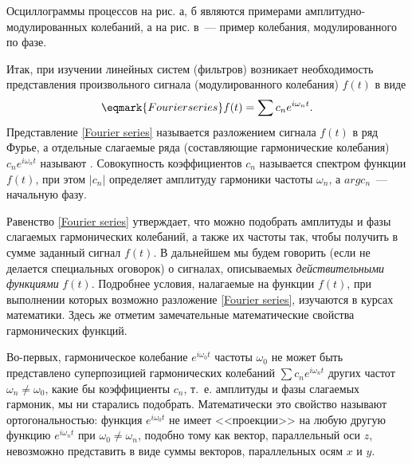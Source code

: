 %

Осциллограммы процессов на рис. а, б являются
примерами амплиту\-дно-модулированных колебаний, а на рис. в~--- пример
колебания, модулированного по фазе.



Итак, при изучении линейных систем (фильтров) возникает необходимость
представления произвольного сигнала
(модулированного колебания) $f(t)$ в виде
\begin{equation}
    \eqmark{Fourier series}
    f(t)=\sum c_n e^{i\omega_n t}.
\end{equation}
Представление \eqref{Fourier series} называется разложением сигнала $f(t)$ в ряд
Фурье, а отдельные слагаемые ряда (составляющие
гармонические колебания) $c_n e^{i\omega_n t}$ называют .
Совокупность коэффициентов $c_n$ называется
спектром функции $f(t)$, при этом $|c_n|$ определяет амплитуду гармоники частоты
$\omega_n$, а $arg c_n$~--- начальную
фазу.

Равенство \eqref{Fourier series} утверждает, что можно подобрать амплитуды и
фазы слагаемых гармонических колебаний, а также их частоты
так, чтобы получить в сумме заданный сигнал $f(t)$. В дальнейшем мы будем
говорить (если не делается специальных
оговорок) о сигналах, описываемых \emph{действительными функциями} $f(t)$.
Подробнее условия, налагаемые на функции
$f(t)$, при выполнении которых возможно разложение \eqref{Fourier series},
изучаются в курсах математики. Здесь же отметим
замечательные математические свойства гармонических функций.

Во-первых, гармоническое колебание $e^{i\omega_0 t}$ частоты $\omega_0$ не может
быть представлено суперпозицией
гармонических колебаний $\sum c_n e^{i\omega_n t}$ других частот
$\omega_n\ne\omega_0$, какие бы коэффициенты $c_n$,
т.~е. амплитуды и фазы слагаемых гармоник, мы ни старались подобрать.
Математически это свойство называют
ортогональностью: функция $e^{i\omega_0 t}$ не имеет <<проекции>> на любую
другую функцию $e^{i\omega_nt}$ при
$\omega_0\ne\omega_n$, подобно тому как вектор, параллельный оси $z$, невозможно
представить в виде суммы векторов, параллельных осям $x$ и $y$.

